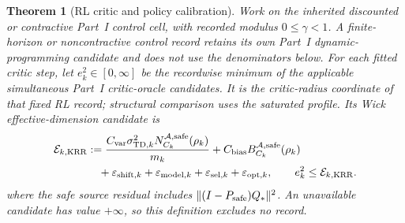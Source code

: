 \documentclass[11pt]{article}
\numberwithin{section}{part}
\theoremstyle{plain}
\newtheorem{theorem}{Theorem}[section]
\theoremstyle{definition}
\theoremstyle{remark}
\begin{document}
\begin{theorem}[RL critic and policy calibration]
\label{thm:wick-rl-loss-calibration}
Work on the inherited discounted or contractive Part~I control cell, with
recorded modulus \(0\le\gamma<1\).  A finite-horizon or noncontractive
control record retains its own Part~I dynamic-programming candidate and does
not use the denominators below.
For each fitted critic step, let \(e_k^2\in[0,\infty]\) be the recordwise
minimum of the applicable simultaneous Part~I critic-oracle candidates.  It
is the critic-radius coordinate of that fixed RL record; structural comparison
uses the saturated profile.  Its Wick
effective-dimension candidate is
\begin{equation}
 \label{eq:wick-rl-critic-oracle}
 \begin{aligned}
 \mathcal E_{k,{\rm KRR}}
 &:=\frac{C_{\rm var}\sigma_{{\rm TD},k}^2
 N_{C_k}^{\mathcal A,{\rm safe}}(\rho_k)}{m_k}
 +C_{\rm bias}B_{C_k}^{\mathcal A,{\rm safe}}(\rho_k)\\
 &\quad+\varepsilon_{{\rm shift},k}
 +\varepsilon_{{\rm model},k}
 +\varepsilon_{{\rm sel},k}
 +\varepsilon_{{\rm opt},k},
 \qquad e_k^2\le \mathcal E_{k,{\rm KRR}}.
 \end{aligned}
\end{equation}
where the safe source residual includes
\(\|(I-P_{\rm safe})Q_*\|^2\).  An unavailable candidate has value
\(+\infty\), so this definition excludes no record.


\end{theorem}
\end{document}
